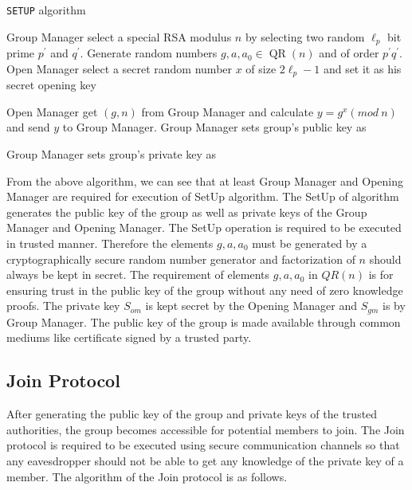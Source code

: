 \begin{algorithm}
\caption{\texttt{SETUP} algorithm}
\begin{algorithmic}[1]
\vspace{10pt}
\STATE Group Manager select a special RSA modulus $n$ by selecting two random $\ell _p$ bit prime $p^\prime$ and $q^\prime$.
\STATE Generate random numbers $g, a, a_0 \in \operatorname{QR}(n)$ and of order $p^\prime q^\prime$.
\STATE Open Manager select a secret random number $x$ of size  $2\ell_p - 1$ and set it as his secret opening key 
\begin{center}
\end{center}
\STATE Open Manager get $(g,n)$ from Group Manager and calculate $y = g^x(mod~n)$ and send $y$ to Group Manager.
\STATE Group Manager sets group's public key as 
\begin{center}
\end{center}
\STATE Group Manager sets group's private key as 
\begin{center}
\end{center}
\vspace{10pt}
\end{algorithmic}
\end{algorithm}

From the above algorithm, we can see that at least Group Manager and Opening Manager are required for execution of SetUp algorithm. The  SetUp of algorithm generates the public key of the group as well as private keys of the Group Manager and Opening Manager. The SetUp operation is required to be executed in trusted manner. Therefore the elements $g, a, a_0$ must be generated by a cryptographically secure random number generator and factorization of $n$ should always be kept in secret. The requirement of elements $g, a, a_0$ in $QR(n)$ is for ensuring trust in the public key of the group without any need of zero knowledge proofs. The private key ${S}_{om}$ is kept secret by the Opening Manager and ${S}_{gm}$ is by Group Manager. The public key of the group is made available through common mediums like certificate signed by a trusted party.
\subsection{Join Protocol}\label{subsec:Joinalgo}
After generating the public key of the group and private keys of the trusted authorities, the group becomes accessible for potential members to join. The Join protocol is required to be executed using secure communication channels so that any eavesdropper should not be able to get any knowledge of the private key of a member. The algorithm of the Join protocol is as follows.

